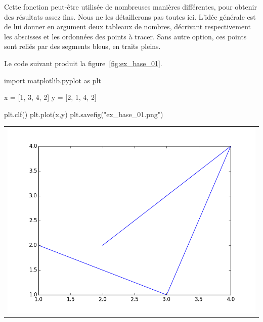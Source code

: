 Cette fonction peut-être utilisée de nombreuses manières différentes, pour obtenir des résultats assez fins. Nous ne les 
détaillerons pas toutes ici. 
L'idée générale est de lui donner en argument deux tableaux de nombres, décrivant respectivement les abscisses et les ordonnées des points à tracer. 
Sans autre option, ces points sont reliés par des segments bleus, en traits pleins. 
\begin{exemple}
  Le code suivant produit la figure~\ref{fig:ex_base_01}.
\begin{pyverbatim}
import matplotlib.pyplot as plt

x = [1, 3, 4, 2]
y = [2, 1, 4, 2]

plt.clf()
plt.plot(x,y)
plt.savefig("ex_base_01.png")
\end{pyverbatim}


  \begin{center}
  \begin{tabular}{c}
    \includegraphics[scale = 0.5]{ex_base_01} \\
    \end{tabular}
    \label{fig:ex_base_01}
  \end{center}
\end{exemple}

